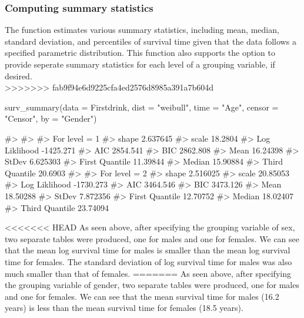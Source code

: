 \hypertarget{computing-summary-statistics-1}{%
\subsubsection{Computing summary
statistics}\label{computing-summary-statistics-1}}

The  function estimates various summary statistics,
including mean, median, standard deviation, and percentiles of survival
time given that the data follows a specified parametric distribution.
This function also supports the option to provide seperate summary
statistics for each level of a grouping variable, if desired.\\
\textgreater{}\textgreater{}\textgreater{}\textgreater{}\textgreater{}\textgreater{}\textgreater{}
fab9f94e6d9225cfa4ed2576d8985a391a7b604d

\begin{Schunk}
\begin{Sinput}
surv_summary(data = Firstdrink, dist = "weibull", time = "Age", censor = "Censor", by = "Gender")
\end{Sinput}
\begin{Soutput}
#> 
#> 
#> For level = 1 
#> shape        2.637645
#> scale        18.2804
#> Log Liklihood    -1425.271
#> AIC      2854.541
#> BIC      2862.808
#> Mean     16.24398
#> StDev        6.625303
#> First Quantile   11.39844
#> Median       15.90884
#> Third Quantile   20.6903
#> 
#> For level = 2 
#> shape        2.516025
#> scale        20.85053
#> Log Liklihood    -1730.273
#> AIC      3464.546
#> BIC      3473.126
#> Mean     18.50288
#> StDev        7.872356
#> First Quantile   12.70752
#> Median       18.02407
#> Third Quantile   23.74094
\end{Soutput}
\end{Schunk}

\textless{}\textless{}\textless{}\textless{}\textless{}\textless{}\textless{}
HEAD As seen above, after specifying the grouping variable of sex, two
separate tables were produced, one for males and one for females. We can
see that the mean log survival time for males is smaller than the mean
log survival time for females. The standard deviation of log survival
time for males was also much smaller than that of females. ======= As
seen above, after specifying the grouping variable of gender, two
separate tables were produced, one for males and one for females. We can
see that the mean survival time for males (16.2 years) is less than the
mean survival time for females (18.5 years).

